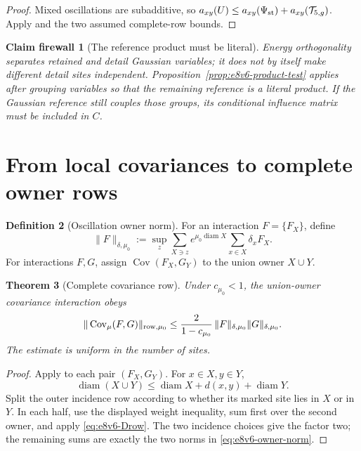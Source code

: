 \documentclass[11pt,oneside]{book}
\newtheorem{theorem}{Theorem}[chapter]
\newtheorem{firewall}[theorem]{Claim firewall}
\theoremstyle{definition}
\newtheorem{definition}[theorem]{Definition}
\theoremstyle{remark}
\begin{document}
\begin{proof}
Mixed oscillations are subadditive, so
\(a_{xy}(U)\le a_{xy}(\Psi_{\rm st})
+a_{xy}({\cal T}_{5,g})\).  Apply
 and the two assumed complete-row bounds.
\end{proof}

\begin{firewall}[The reference product must be literal]
\label{fire:e8v6-product}
Energy orthogonality separates retained and detail Gaussian
variables; it does not by itself make different detail sites
independent.  Proposition~\ref{prop:e8v6-product-test} applies after
grouping variables so that the remaining reference is a literal
product.  If the Gaussian reference still couples those groups, its
conditional influence matrix must be included in \(C\).
\end{firewall}

\section{From local covariances to complete owner rows}
\label{sec:e8v6-owner-row}

\begin{definition}[Oscillation owner norm]
\label{def:e8v6-owner-norm}
For an interaction \(F=\{F_X\}\), define
\[
 \|F\|_{\delta,\mu_0}
 :=
 \sup_z\sum_{X\ni z}e^{\mu_0\operatorname{diam}X}
 \sum_{x\in X}\delta_xF_X.                           \label{eq:e8v6-owner-norm}
\]
For interactions \(F,G\), assign
\(\operatorname{Cov}(F_X,G_Y)\) to the union owner \(X\cup Y\).
\end{definition}

\begin{theorem}[Complete covariance row]
\label{thm:e8v6-complete-covariance}
Under \(c_{\mu_0}<1\), the union-owner covariance interaction obeys
\[
 \|\operatorname{Cov}_\mu(F,G)\|_{{\rm row},\mu_0}
 \le\frac{2}{1-c_{\mu_0}}\,
 \|F\|_{\delta,\mu_0}\|G\|_{\delta,\mu_0}.           \label{eq:e8v6-complete-covariance}
\]
The estimate is uniform in the number of sites.
\end{theorem}

\begin{proof}
Apply  to each pair
\((F_X,G_Y)\).  For \(x\in X,y\in Y\),
\[
 \operatorname{diam}(X\cup Y)
 \le\operatorname{diam}X+d(x,y)+\operatorname{diam}Y.
\]
Split the outer incidence row according to whether its marked site
lies in \(X\) or in \(Y\).  In each half, use the displayed weight
inequality, sum first over the second owner, and apply
\eqref{eq:e8v6-Drow}.  The two incidence choices give the factor two;
the remaining sums are exactly the two norms in
\eqref{eq:e8v6-owner-norm}.
\end{proof}
\end{document}
